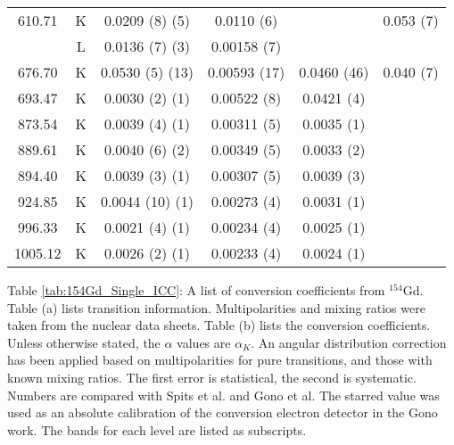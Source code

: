 \begin{table}
\begin{ThreePartTable}
\begin{tabular}{c|c|c|c|c|c}
            \hline
            610.71	& K &	0.0209	(8) (5)	&	0.0110 (6)	& &	0.053 (7)	\\
            		& L &	0.0136	(7) (3)	&	0.00158 (7)	&		\\
            \hline
            676.70	& K &	0.0530	(5) (13)	&	0.00593 (17)	&	0.0460 (46) & 0.040 (7)	\\
            \hline
            693.47	& K &	0.0030	(2) (1)	&	0.00522 (8)	&	0.0421 (4)	\\
            \hline
            873.54	& K &	0.0039	(4) (1) &	0.00311 (5)	&	0.0035 (1)	\\
            \hline
            889.61	& K &	0.0040	(6) (2)	&	0.00349 (5)	&	0.0033 (2)	\\
            \hline
            894.40	& K &	0.0039	(3)	(1)	&	0.00307 (5)	&	0.0039 (3)	\\
            \hline
            924.85	& K &	0.0044	(10) (1)	&	0.00273 (4)	&	0.0031 (1)	\\
            \hline
            996.33	& K &	0.0021	(4) (1)	&	0.00234 (4)	&	0.0025 (1)	\\
            \hline
            1005.12	& K &	0.0026	(2) (1)	&	0.00233 (4)	&	0.0024 (1)	\\
            \bottomrule
        \end{tabular}
        \makeatletter\def\TPT@hsize{}\makeatletter
        \begin{tablenotes}[para]
            Table \ref{tab:154Gd_Single_ICC}: A list of conversion coefficients from $^{154}$Gd. Table (a) lists transition information. Multipolarities and mixing ratios were taken from the nuclear data sheets\citep{reich09:_nds_154}. Table (b) lists the conversion coefficients. Unless otherwise stated, the $\alpha$ values are $\alpha_K$. An angular distribution correction has been applied based on multipolarities for pure transitions, and those with known mixing ratios. The first error is statistical, the second is systematic. Numbers are compared with Spits et al.\citep{spits96:_154gd} and Gono et al.\citep{gono74:_154gd_e0} The starred value was used as an absolute calibration of the conversion electron detector in the Gono work. The bands for each level are listed as subscripts.
        \end{tablenotes}
\end{ThreePartTable}
\end{table}
